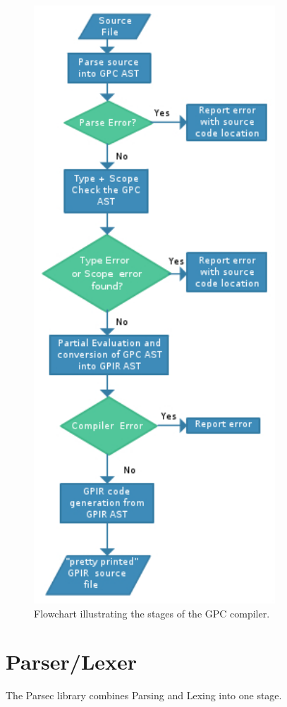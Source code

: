 \begin{figure}[!htb]
\begin{center}
\includegraphics{graphs/Dissertation.pdf}
\caption{Flowchart illustrating the stages of the GPC compiler.}
\end{center}
\end{figure}

    
\section{Parser/Lexer}
The Parsec library combines Parsing and Lexing into one stage.

